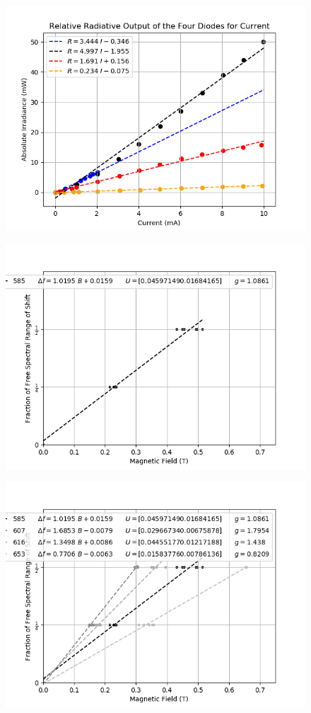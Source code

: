 \documentclass[8pt, a4paper]{article}
\begin{document}
\newpage
\begin{figure}[h]
\includegraphics{ri.png}
\end{figure}



\newpage
\begin{figure}[h]
\includegraphics{zeem1.png}
\end{figure}

\begin{figure}[h]
\includegraphics{zeem.png}
\end{figure}


\end{document}
